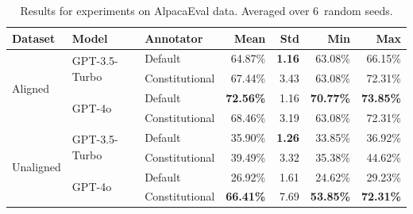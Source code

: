 \begin{table}[H]
\centering
\caption{Results for experiments on AlpacaEval data. Averaged over 6~random seeds.}
\label{tab:alpaca_num_results}
\begin{tabularx}{\textwidth}{lllrrrr}
\toprule
\textbf{Dataset} & \textbf{Model} & \textbf{Annotator} & \textbf{Mean} & \textbf{Std} & \textbf{Min} & \textbf{Max} \\
\midrule
\multirow[t]{4}{*}{Aligned} & \multirow[t]{2}{*}{GPT-3.5-Turbo} & Default & 64.87\% & \textbf{1.16} & 63.08\% & 66.15\% \\
 &  & Constitutional & 67.44\% & 3.43 & 63.08\% & 72.31\% \\
 & \multirow[t]{2}{*}{GPT-4o} & Default & \textbf{72.56\%} & 1.16 & \textbf{70.77\%} & \textbf{73.85\%} \\
 &  & Constitutional & 68.46\% & 3.19 & 63.08\% & 72.31\% \\
\multirow[t]{4}{*}{Unaligned} & \multirow[t]{2}{*}{GPT-3.5-Turbo} & Default & 35.90\% & \textbf{1.26} & 33.85\% & 36.92\% \\
 &  & Constitutional & 39.49\% & 3.32 & 35.38\% & 44.62\% \\
 & \multirow[t]{2}{*}{GPT-4o} & Default & 26.92\% & 1.61 & 24.62\% & 29.23\% \\
 &  & Constitutional & \textbf{66.41\%} & 7.69 & \textbf{53.85\%} & \textbf{72.31\%} \\
\bottomrule
\end{tabularx}
\end{table}

